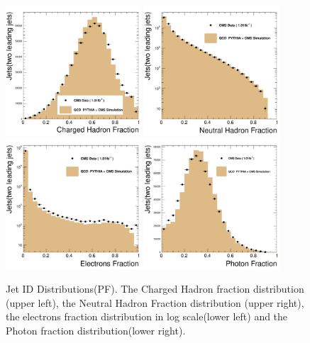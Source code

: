 \begin{figure}[!ht]
  \begin{center}
    \includegraphics[width=0.45\textwidth]{Figures/c_fCh_pf.pdf}
    \includegraphics[width=0.45\textwidth]{Figures/c_fNh_pf.pdf}
    \includegraphics[width=0.45\textwidth]{Figures/c_fEl_pf.pdf}
    \includegraphics[width=0.45\textwidth]{Figures/c_fPh_pf.pdf}

    \caption{Jet ID Distributions(PF).  The Charged Hadron fraction distribution
      (upper left), the Neutral Hadron Fraction distribution (upper right),
      the electrons fraction distribution in log scale(lower left) and the Photon
      fraction distribution(lower right). }
    \label{jet_id_pf}
  \end{center}
\end{figure}

